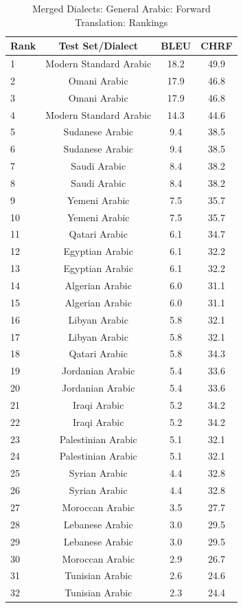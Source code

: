 \begin{table}[htbp]
\centering
\caption{Merged Dialects: General Arabic: Forward Translation: Rankings}
\label{tab:testset_ranking_forward_merged_arabic_general}
\begin{tabular}{l@{\hspace{3pt}}c@{\hspace{3pt}}c@{\hspace{3pt}}c}
\toprule
Rank & Test Set/Dialect & BLEU & CHRF \\
\midrule
1 & Modern Standard Arabic  & 18.2 & 49.9 \\
2 & Omani Arabic & 17.9 & 46.8 \\
3 & Omani Arabic  & 17.9 & 46.8 \\
4 & Modern Standard Arabic & 14.3 & 44.6 \\
5 & Sudanese Arabic & 9.4 & 38.5 \\
6 & Sudanese Arabic  & 9.4 & 38.5 \\
7 & Saudi Arabic & 8.4 & 38.2 \\
8 & Saudi Arabic  & 8.4 & 38.2 \\
9 & Yemeni Arabic & 7.5 & 35.7 \\
10 & Yemeni Arabic  & 7.5 & 35.7 \\
11 & Qatari Arabic  & 6.1 & 34.7 \\
12 & Egyptian Arabic & 6.1 & 32.2 \\
13 & Egyptian Arabic  & 6.1 & 32.2 \\
14 & Algerian Arabic & 6.0 & 31.1 \\
15 & Algerian Arabic  & 6.0 & 31.1 \\
16 & Libyan Arabic & 5.8 & 32.1 \\
17 & Libyan Arabic  & 5.8 & 32.1 \\
18 & Qatari Arabic & 5.8 & 34.3 \\
19 & Jordanian Arabic & 5.4 & 33.6 \\
20 & Jordanian Arabic  & 5.4 & 33.6 \\
21 & Iraqi Arabic & 5.2 & 34.2 \\
22 & Iraqi Arabic  & 5.2 & 34.2 \\
23 & Palestinian Arabic & 5.1 & 32.1 \\
24 & Palestinian Arabic  & 5.1 & 32.1 \\
25 & Syrian Arabic & 4.4 & 32.8 \\
26 & Syrian Arabic  & 4.4 & 32.8 \\
27 & Moroccan Arabic  & 3.5 & 27.7 \\
28 & Lebanese Arabic & 3.0 & 29.5 \\
29 & Lebanese Arabic  & 3.0 & 29.5 \\
30 & Moroccan Arabic & 2.9 & 26.7 \\
31 & Tunisian Arabic  & 2.6 & 24.6 \\
32 & Tunisian Arabic & 2.3 & 24.4 \\
\bottomrule
\end{tabular}
\end{table}